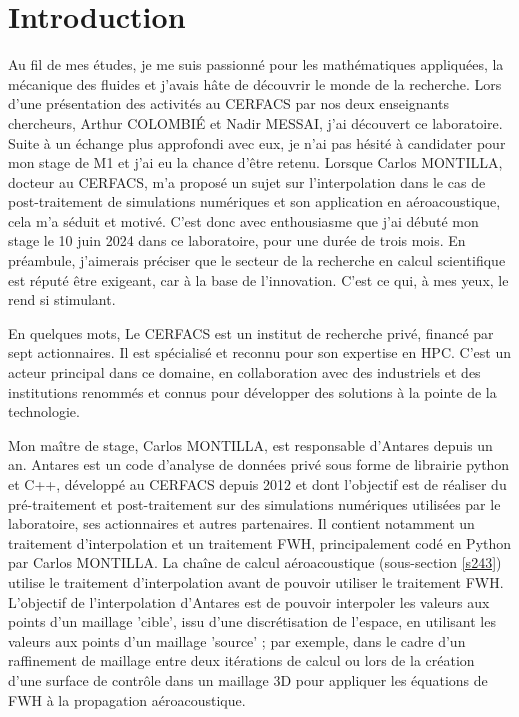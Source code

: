 \section*{Introduction}

Au fil de mes études, je me suis passionné pour les mathématiques appliquées, la mécanique des fluides et j’avais hâte de découvrir le monde de la recherche. Lors d’une présentation des activités au \ac{CERFACS} par nos deux enseignants chercheurs, Arthur COLOMBIÉ et Nadir MESSAI, j’ai découvert ce laboratoire. Suite à un échange plus approfondi avec eux,  je n’ai pas hésité à candidater pour mon stage de M1 et j’ai eu la chance d’être retenu.
Lorsque Carlos MONTILLA, docteur au CERFACS, m’a proposé un sujet sur l’interpolation dans le cas de post-traitement de simulations numériques et son application en aéroacoustique, cela m’a séduit et motivé. C’est donc avec enthousiasme que j’ai débuté mon stage le 10 juin 2024 dans ce laboratoire, pour une durée de trois mois.
En préambule, j’aimerais préciser que le secteur de la recherche en calcul scientifique est réputé être exigeant, car à la base de l’innovation. C’est ce qui, à mes yeux, le rend si stimulant.

En quelques mots, Le CERFACS est un institut de recherche privé, financé par sept actionnaires. Il est spécialisé et reconnu pour son expertise en \ac{HPC}. C’est un acteur principal dans ce domaine, en collaboration avec des industriels et des institutions renommés et connus pour développer des solutions à la pointe de la technologie.

Mon maître de stage, Carlos MONTILLA, est responsable d’Antares \cite{antares} depuis un an. Antares est un code d’analyse de données privé sous forme de librairie python et C++, développé au CERFACS depuis 2012 et dont l’objectif est de réaliser du pré-traitement et post-traitement sur des simulations numériques utilisées par le laboratoire, ses actionnaires et autres partenaires. Il contient notamment un traitement d’interpolation et un traitement \ac{FWH}, principalement codé en Python par Carlos MONTILLA. La chaîne de calcul aéroacoustique (sous-section \ref{s243}) utilise le traitement d’interpolation avant de pouvoir utiliser le traitement FWH. L’objectif de l’interpolation d’Antares est de pouvoir interpoler les valeurs aux points d’un maillage ’cible’, issu d’une discrétisation de l’espace, en utilisant les valeurs aux points d’un maillage ’source’ ; par exemple, dans le cadre d’un raffinement de maillage entre deux itérations de calcul ou lors de la création d’une surface de contrôle dans un maillage 3D pour appliquer les équations de FWH à la propagation aéroacoustique.

